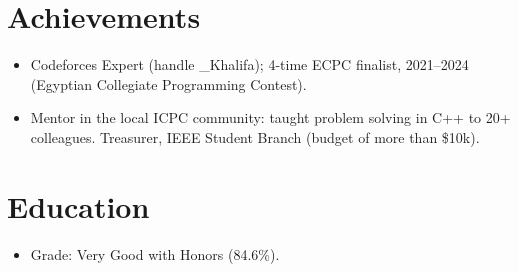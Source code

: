 \documentclass[10pt]{article}
\begin{document}
\section*{Achievements}
\begin{itemize}
  \item Codeforces Expert (handle \_Khalifa); 4-time ECPC finalist, 2021--2024 (Egyptian Collegiate Programming Contest).
  \item Mentor in the local ICPC community: taught problem solving in C++ to 20+ colleagues. Treasurer, IEEE Student Branch (budget of more than \$10k).
\end{itemize}

\section*{Education}
\begin{itemize}
  \item Grade: Very Good with Honors (84.6\%).
\end{itemize}
\end{document}
